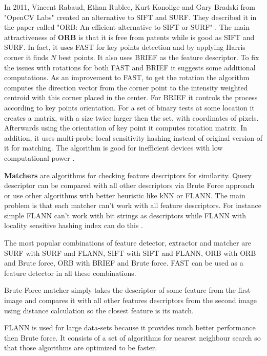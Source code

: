 \documentclass[../../../../main]{subfiles}
\begin{document}
In 2011, Vincent Rabaud, Ethan Rublee, Kurt Konolige and Gary Bradski from "OpenCV Labs" created an alternative to \ac{SIFT} and \ac{SURF}. They described it in the paper called "ORB: An efficient alternative to \ac{SIFT} or \ac{SURF}" \cite{orb_rublee}. The main attractiveness of \textbf{\ac{ORB}} is that it is free from patents while is good as \ac{SIFT} and \ac{SURF}. 
In fact, it uses \ac{FAST} for key points detection and by applying Harris corner it finds $N$ best points. It also uses \ac{BRIEF} as the feature descriptor. To fix the issues with rotations for both \ac{FAST} and \ac{BRIEF} it suggests some additional computations. As an improvement to \ac{FAST}, to get the rotation the algorithm computes the direction vector from the corner point to the intensity weighted centroid with this corner placed in the center. For \ac{BRIEF} it controls the process according to key points orientation. For a set of binary tests at some location it creates a matrix, with a size twice larger then the set, with coordinates of pixels. Afterwards using the orientation of key point it computes rotation matrix. In addition, it uses multi-probe local sensitivity hashing instead of original version of it for matching. The algorithm is good for inefficient devices with low computational power \cite{opencv_docs_orb}.

\textbf{Matchers} are algorithms for checking feature descriptors for similarity. Query descriptor can be compared with all other descriptors via Brute Force approach or use other algorithms with better heuristic like \ac{kNN} or \ac{FLANN}. The main problem is that each matcher can't work with all feature descriptors. For instance simple \ac{FLANN} can't work with bit strings as descriptors while \ac{FLANN} with locality sensitive hashing index can do this \cite{opencv_docs_matchers}.

The most popular combinations of feature detector, extractor and matcher are \ac{SURF} with \ac{SURF} and \ac{FLANN}, \ac{SIFT} with \ac{SIFT} and \ac{FLANN}, \ac{ORB} with \ac{ORB} and Brute force, \ac{ORB} with \ac{BRIEF} and Brute force. \ac{FAST} can be used as a feature detector in all these combinations.

Brute-Force matcher simply takes the descriptor of some feature from the first image and compares it with all other features descriptors from the second image using distance calculation so the closest feature is its match.

\ac{FLANN} is used for large data-sets because it provides much better performance then Brute force. It consists of a set of algorithms for nearest neighbour search so that those algorithms are optimized to be faster.
\end{document}
